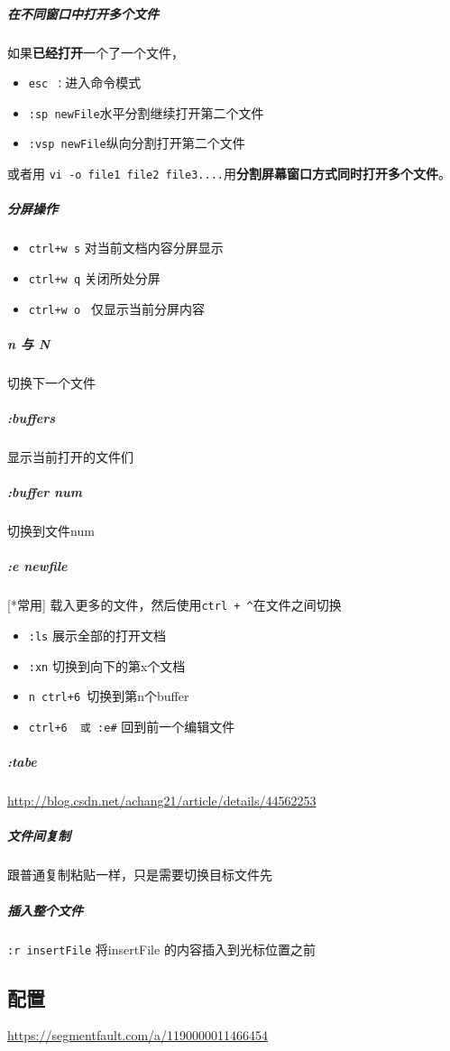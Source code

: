 \documentclass[UTF8,a4paper,12pt]{ctexbook}
\begin{document}
				\subparagraph{在不同窗口中打开多个文件}	
					如果\textbf{已经打开}一个了一个文件，
					
					\begin{itemize}[itemindent = 2em]
						\item \verb|esc ：|进入命令模式
						\item \verb|:sp newFile|水平分割继续打开第二个文件
						\item \verb|:vsp newFile|纵向分割打开第二个文件
					\end{itemize}
				
					或者用 \verb|vi -o file1 file2 file3....|用\textbf{分割屏幕窗口方式同时打开多个文件}。
					
				\subparagraph{分屏操作}
					\begin{itemize}[itemindent = 2em]
						\item \verb|ctrl+w s|   对当前文档内容分屏显示
						\item \verb|ctrl+w q|   关闭所处分屏
						\item \verb|ctrl+w o |  仅显示当前分屏内容
					\end{itemize}
				
				\subparagraph{n 与 N} 切换下一个文件
				\subparagraph{:buffers} 显示当前打开的文件们
				\subparagraph{:buffer num} 切换到文件num
				
				\subparagraph{:e newfile}[*常用] 载入更多的文件，然后使用\verb|ctrl + ^|在文件之间切换
				
					\begin{itemize}[itemindent = 2em]
						\item \verb|:ls|  展示全部的打开文档
						
						\item \verb|:xn|  切换到向下的第x个文档
						
						\item \verb|n ctrl+6 |切换到第n个buffer
						
						\item \verb|ctrl+6  或 :e#|   回到前一个编辑文件
					\end{itemize}
				
				
				
				
				\subparagraph{:tabe}
				\url{http://blog.csdn.net/achang21/article/details/44562253}
				\subparagraph{文件间复制} 跟普通复制粘贴一样，只是需要切换目标文件先
				
				\subparagraph{插入整个文件} \verb|:r insertFile| 将insertFile 的内容插入到光标位置之前 	
		
		\subsection{配置}
			\url{https://segmentfault.com/a/1190000011466454}
			
\end{document}
